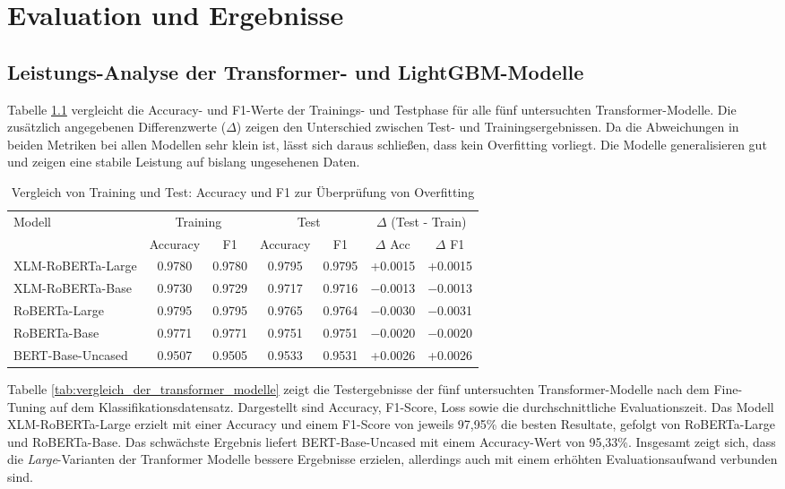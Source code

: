 \chapter{Evaluation und Ergebnisse}
\label{chap:evaluation_und_ergebnisse}

\section{Leistungs-Analyse der Transformer- und LightGBM-Modelle}

Tabelle \ref{tab:overfitting_check} vergleicht die Accuracy- und F1-Werte der Trainings- und Testphase für alle fünf untersuchten Transformer-Modelle. 
Die zusätzlich angegebenen Differenzwerte ($\Delta$) zeigen den Unterschied zwischen Test- und Trainingsergebnissen. 
Da die Abweichungen in beiden Metriken bei allen Modellen sehr klein ist, lässt sich daraus schließen, dass kein Overfitting vorliegt. 
Die Modelle generalisieren gut und zeigen eine stabile Leistung auf bislang ungesehenen Daten.

\begin{table}[ht]
\centering
\begin{tabular}{lcccccc}
    \toprule
    \multirow{2}{*}{Modell} & 
    \multicolumn{2}{c}{Training} & 
    \multicolumn{2}{c}{Test} & 
    \multicolumn{2}{c}{$\Delta$ (Test - Train)} \\
    \cmidrule(lr){2-3} \cmidrule(lr){4-5} \cmidrule(l){6-7}
    & Accuracy & F1 & Accuracy & F1 & $\Delta$ Acc & $\Delta$ F1 \\
    \midrule
    XLM-RoBERTa-Large   & 0.9780 & 0.9780 & 0.9795 & 0.9795 & +0.0015 & +0.0015 \\
    XLM-RoBERTa-Base    & 0.9730 & 0.9729 & 0.9717 & 0.9716 & $-$0.0013 & $-$0.0013 \\
    RoBERTa-Large       & 0.9795 & 0.9795 & 0.9765 & 0.9764 & $-$0.0030 & $-$0.0031 \\
    RoBERTa-Base        & 0.9771 & 0.9771 & 0.9751 & 0.9751 & $-$0.0020 & $-$0.0020 \\
    BERT-Base-Uncased   & 0.9507 & 0.9505 & 0.9533 & 0.9531 & +0.0026 & +0.0026 \\
    \bottomrule
\end{tabular}
\caption{Vergleich von Training und Test: Accuracy und F1 zur Überprüfung von Overfitting}
\label{tab:overfitting_check}
\end{table}

Tabelle \ref{tab:vergleich_der_transformer_modelle} zeigt die Testergebnisse der fünf untersuchten Transformer-Modelle nach dem Fine-Tuning auf dem 
Klassifikationsdatensatz. 
Dargestellt sind Accuracy, F1-Score, Loss sowie die durchschnittliche Evaluationszeit. Das Modell XLM-RoBERTa-Large erzielt mit einer 
Accuracy und einem F1-Score von jeweils 97,95\% die besten Resultate, gefolgt von RoBERTa-Large und RoBERTa-Base. 
Das schwächste Ergebnis liefert BERT-Base-Uncased mit einem Accuracy-Wert von 95,33\%. Insgesamt zeigt sich, dass die \textit{Large}-Varianten
der Tranformer Modelle bessere Ergebnisse erzielen, allerdings auch mit einem erhöhten Evaluationsaufwand verbunden sind.


